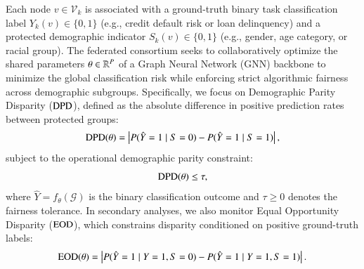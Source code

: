 Each node $v \in \mathcal{V}_k$ is associated with a ground-truth binary task classification label $Y_k(v) \in \{0, 1\}$ (e.g., credit default risk or loan delinquency) and a protected demographic indicator $S_k(v) \in \{0, 1\}$ (e.g., gender, age category, or racial group). The federated consortium seeks to collaboratively optimize the shared parameters $\theta \in \mathbb{R}^P$ of a Graph Neural Network (GNN) backbone to minimize the global classification risk while enforcing strict algorithmic fairness across demographic subgroups. Specifically, we focus on Demographic Parity Disparity ($\mathrm{DPD}$), defined as the absolute difference in positive prediction rates between protected groups:
\begin{equation}
\label{eq:dpd_def}
\mathrm{DPD}(\theta) = \left| P(\hat{Y}=1 \mid S=0) - P(\hat{Y}=1 \mid S=1) \right|,
\end{equation}
subject to the operational demographic parity constraint:
\begin{equation}
\label{eq:dpd_constraint}
\mathrm{DPD}(\theta) \le \tau,
\end{equation}
where $\hat{Y} = f_\theta(\mathcal{G})$ is the binary classification outcome and $\tau \ge 0$ denotes the fairness tolerance. In secondary analyses, we also monitor Equal Opportunity Disparity ($\mathrm{EOD}$), which constrains disparity conditioned on positive ground-truth labels:
\begin{equation}
\label{eq:eod_def}
\mathrm{EOD}(\theta) = \left| P(\hat{Y}=1 \mid Y=1, S=0) - P(\hat{Y}=1 \mid Y=1, S=1) \right|.
\end{equation}

